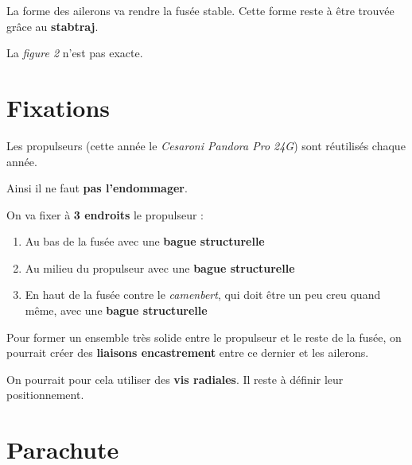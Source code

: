 \documentclass[6pt,a4paper]{article}
\begin{document}
\vspace{1\baselineskip}

La forme des ailerons va rendre la fusée stable. Cette forme reste à être trouvée grâce au \textbf{stabtraj}.

La \textit{figure 2} n'est pas exacte.

\vspace{1\baselineskip}

\section{\large Fixations}

\vspace{1\baselineskip}

Les propulseurs (cette année le \textit{Cesaroni Pandora Pro 24G}) sont réutilisés chaque année.

Ainsi il ne faut \textbf{pas l'endommager}.

\vspace{1\baselineskip}

On va fixer à \textbf{3 endroits} le propulseur :
\begin{enumerate}
	\item Au bas de la fusée avec une \textbf{bague structurelle}
	\item Au milieu du propulseur avec une \textbf{bague structurelle}
	\item En haut de la fusée contre le \textit{camenbert}, qui doit être un peu creu quand même, avec une \textbf{bague structurelle}
\end{enumerate}

\vspace{1\baselineskip}

Pour former un ensemble très solide entre le propulseur et le reste de la fusée, on pourrait créer des \textbf{liaisons encastrement} entre ce dernier et les ailerons.

\vspace{1\baselineskip}

On pourrait pour cela utiliser des \textbf{vis radiales}. Il reste à définir leur positionnement.

\vspace{1\baselineskip}

\section{\large Parachute}

\vspace{1\baselineskip}
\end{document}
